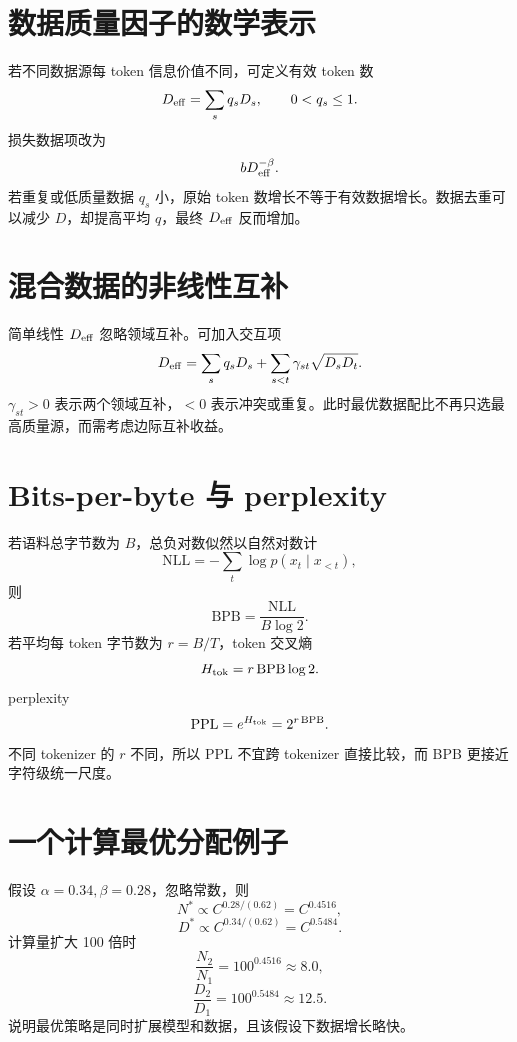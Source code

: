 \documentclass[UTF8,12pt,a4paper,fontset=none]{ctexart}
\numberwithin{equation}{section}
\begin{document}
\section{数据质量因子的数学表示}
若不同数据源每 token 信息价值不同，可定义有效 token 数
\begin{equation}
 D_{\rm eff}=\sum_{s}q_sD_s,
 \qquad 0<q_s\le1.
\end{equation}
损失数据项改为
\begin{equation}
 bD_{\rm eff}^{-\beta}.
\end{equation}
若重复或低质量数据 $q_s$ 小，原始 token 数增长不等于有效数据增长。数据去重可以减少 $D$，却提高平均 $q$，最终 $D_{\rm eff}$ 反而增加。

\section{混合数据的非线性互补}
简单线性 $D_{\rm eff}$ 忽略领域互补。可加入交互项
\begin{equation}
 D_{\rm eff}=\sum_sq_sD_s+
 \sum_{s<t}\gamma_{st}\sqrt{D_sD_t}.
\end{equation}
$\gamma_{st}>0$ 表示两个领域互补，$<0$ 表示冲突或重复。此时最优数据配比不再只选最高质量源，而需考虑边际互补收益。

\section{Bits-per-byte 与 perplexity}
若语料总字节数为 $B$，总负对数似然以自然对数计
\begin{equation}
 \mathrm{NLL}=-\sum_t\log p(x_t\mid x_{<t}),
\end{equation}
则
\begin{equation}
 \mathrm{BPB}=\frac{\mathrm{NLL}}{B\log2}.
\end{equation}
若平均每 token 字节数为 $r=B/T$，token 交叉熵
\begin{equation}
 H_{\rm tok}=r\,\mathrm{BPB}\log2.
\end{equation}
perplexity
\begin{equation}
 \mathrm{PPL}=e^{H_{\rm tok}}
 =2^{r\,\mathrm{BPB}}.
\end{equation}
不同 tokenizer 的 $r$ 不同，所以 PPL 不宜跨 tokenizer 直接比较，而 BPB 更接近字符级统一尺度。

\section{一个计算最优分配例子}
假设 $\alpha=0.34,\beta=0.28$，忽略常数，则
\begin{equation}
 N^*\propto C^{0.28/(0.62)}=C^{0.4516},
\end{equation}
\begin{equation}
 D^*\propto C^{0.34/(0.62)}=C^{0.5484}.
\end{equation}
计算量扩大 100 倍时
\begin{equation}
 \frac{N_2}{N_1}=100^{0.4516}\approx8.0,
\end{equation}
\begin{equation}
 \frac{D_2}{D_1}=100^{0.5484}\approx12.5.
\end{equation}
说明最优策略是同时扩展模型和数据，且该假设下数据增长略快。
\end{document}
